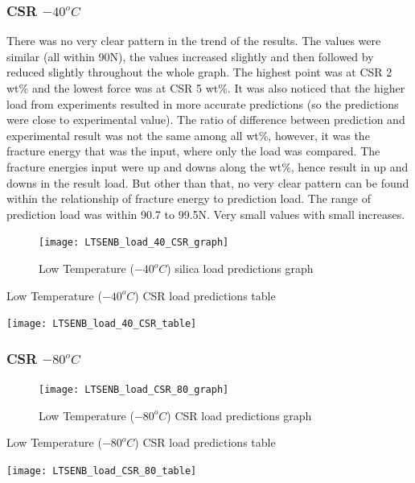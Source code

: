 \documentclass[numbers=noendperiod,chapterprefix=on]{icldt} %
\begin{document}
{\subsubsection{CSR $ -40 ^{o}C$}
There was no very clear pattern in the trend of the results. The values were similar (all within 90N), the values increased slightly and then followed by reduced slightly throughout the whole graph. The highest point was at CSR 2 wt\% and the lowest force was at CSR 5 wt\%. It was also noticed that the higher load from experiments resulted in more accurate predictions (so the predictions were close to experimental value). The ratio of difference between prediction and experimental result was not the same among all wt\%, however, it was the fracture energy that was the input, where only the load was compared. The fracture energies input were up and downs along the wt\%, hence result in up and downs in the result load. But other than that, no very clear pattern can be found within the relationship of fracture energy to prediction load.
The range of prediction load was within 90.7 to 99.5N. Very small values with small increases.

\begin{figure}[!hp]
  \centering
  \texttt{[image: LTSENB\_load\_40\_CSR\_graph]}\label{LTSENB_load_40_CSR_graph}
  \caption{Low Temperature ($ -40 ^{o}C$) silica load predictions graph}
  \end{figure}
  \FloatBarrier
 
 \begin{table}
   \centering
   \caption{Low Temperature ($ -40 ^{o}C$) CSR load predictions table}\label{LTSENB_load_40_CSR_table}
   \texttt{[image: LTSENB\_load\_40\_CSR\_table]}
   \end{table}
   \FloatBarrier

\subsubsection{CSR $ -80 ^{o}C$}

\begin{figure}[!hp]
  \centering
  \texttt{[image: LTSENB\_load\_CSR\_80\_graph]}\label{LTSENB_load_CSR_80_graph}
  \caption{Low Temperature ($ -80 ^{o}C$) CSR load predictions graph}
  \end{figure}
 \FloatBarrier
 
 \begin{table}
   \centering
   \caption{Low Temperature ($ -80 ^{o}C$) CSR load predictions table}\label{LTSENB_load_80_CSR_table}
   \texttt{[image: LTSENB\_load\_CSR\_80\_table]}
   \end{table}
   \FloatBarrier
   
}
\end{document}
